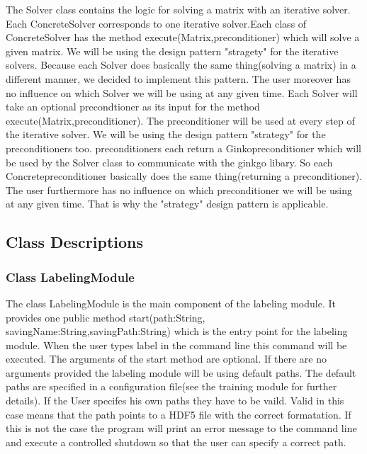 \documentclass[parskip=full]{scrartcl}
\begin{document}
The Solver class contains the logic for solving a matrix with an \gls{iterative solver}.
Each ConcreteSolver corresponds to one \gls{iterative solver}.Each class of ConcreteSolver has the method execute(Matrix,\gls{preconditioner}) which will solve a given matrix.
We will be using the design pattern "stragety" for the \glspl{iterative solver}.
Because each Solver does basically the same thing(solving a matrix) in a different manner, we decided to implement this pattern.
The user moreover has no influence on which Solver we will be using at any given time.
Each Solver will take an optional precondtioner as its input for the method execute(Matrix,\gls{preconditioner}).
The \gls{preconditioner} will be used at every step of the \gls{iterative solver}.
We will be using the design pattern "\gls{strategy}" for the \glspl{preconditioner} too. \glspl{preconditioner} each return a Ginko\gls{preconditioner} which will be used by the Solver class to communicate with the ginkgo libary.
So each Concrete\gls{preconditioner} basically does the same thing(returning a \gls{preconditioner}).
The user furthermore has no influence on which \gls{preconditioner} we will be using at any given time. That is why the "\gls{strategy}" design pattern is applicable.

\subsection{Class Descriptions}

\subsubsection{Class LabelingModule}
The class LabelingModule is the main component of the labeling module.
It provides one public method start(path:String, savingName:String,savingPath:String) which is the entry point for the labeling module.
When the user types label in the command line this command will be executed.
The arguments of the start method are optional.
If there are no arguments provided the labeling module will be using default paths.
The default paths are specified in a configuration file(see the training module for further details).
If the User specifes his own paths they have to be vaild.
Valid in this case means that the path points to a \gls{HDF5} file with the correct formatation.
If this is not the case the program will print an error message to the command line and execute a controlled shutdown so that the user can specify a correct path.
\end{document}
